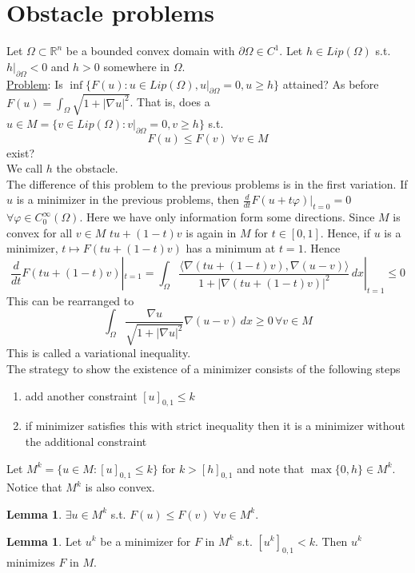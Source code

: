 \documentclass[a4paper, 12pt]{article}
\theoremstyle{plain}
\theoremstyle{definition}
\theoremstyle{lemma}
\newtheorem{lemma}[theorem]{Lemma}
\theoremstyle{remark}
\theoremstyle{corollary}
\theoremstyle{example}
\begin{document}
	\section{Obstacle problems}
	Let $\Omega \subset \mathbb{R}^n$ be a bounded convex domain with $\partial \Omega \in C^1$. Let $h \in Lip(\Omega)$ s.t. $h|_{\partial \Omega} <0$ and $h>0$ somewhere in $\Omega$.\\
	\underline{Problem}: Is $\inf\{F(u): u \in Lip(\Omega), u|_{\partial \Omega} = 0, u \geq h\}$ attained? As before $F(u) = \int_\Omega \sqrt{1+\left|\nabla u\right|^2}$. That is, does a $u \in M = \{v \in Lip(\Omega): v|_{\partial \Omega} = 0, v \geq h\}$ s.t. \[F(u) \leq F(v) \; \forall v \in M\] exist?\\
	We call $h$ the obstacle.\\
	The difference of this problem to the previous problems is in the first variation. If $u$ is a minimizer in the previous problems, then $\frac{d}{dt} F(u+t\varphi)|_{t=0} = 0$ $\forall \varphi \in C_0^\infty(\Omega)$. Here we have only information form some directions. Since $M$ is convex for all $v \in M$ $tu+(1-t)v$ is again in $M$ for $t \in [0,1]$. Hence, if $u$ is a minimizer, $t \mapsto F(tu+(1-t)v)$ has a minimum at $t=1$. Hence \[\frac{d}{dt} F(tu+(1-t)v)|_{t=1} = \int_\Omega \frac{\langle\nabla(tu+(1-t)v),\nabla(u-v)\rangle}{1+\left|\nabla(tu + (1-t)v)\right|^2} \, dx |_{t=1}\leq 0\]
	This can be rearranged to \[\int_\Omega\frac{\nabla u}{\sqrt{1+\left|\nabla u\right|^2}} \nabla(u-v) \, dx \geq 0 \, \forall v \in M\] This is called a variational inequality.\\
	The strategy to show the existence of a minimizer consists of the following steps
	\begin{enumerate}
		\item add another constraint $[u]_{0,1} \leq k$
		\item if minimizer satisfies this with strict inequality then it is a minimizer without the additional constraint
	\end{enumerate}
	Let $M^k = \{u \in M: [u]_{0,1} \leq k\}$ for $k > [h]_{0,1}$ and note that $\max\{0,h\} \in M^k$. Notice that $M^k$ is also convex.
	\begin{lemma}
		$\exists u \in M^k$ s.t. $F(u) \leq F(v) \; \forall v \in M^k$.
	\end{lemma}
	\begin{lemma}
		Let $u^k$ be a minimizer for $F$ in $M^k$ s.t. $[u^k]_{0,1} <k$. Then $u^k$ minimizes $F$ in $M$.
	\end{lemma}
\end{document}

